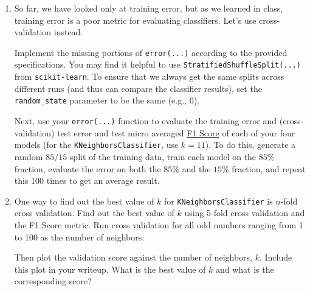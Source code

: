 \begin{enumerate}
\item {} So far, we have looked only at training error, but as we learned in class, training error is a poor metric for evaluating classifiers. Let's use cross-validation instead.

Implement the missing portions of \verb|error(...)| according to the provided specifications. You may find it helpful to use \verb|StratifiedShuffleSplit(...)| from \verb|scikit-learn|. To ensure that we always get the same splits across different runs (and thus can compare the classifier results), set the \verb|random_state| parameter to be the same (e.g., 0).


Next, use your \verb|error(...)| function to evaluate the training error and (cross-validation) test error and test micro averaged \href{https://scikit-learn.org/stable/modules/generated/sklearn.metrics.f1_score.html?highlight=f1\%20score#sklearn.metrics.f1_score}{F1 Score} of each of your four models (for the \verb|KNeighborsClassifier|, use $k=11$). To do this, generate a random $85/15$ split of the training data, train each model on the $85\%$ fraction, evaluate the error on both the $85\%$ and the $15\%$ fraction, and repeat this $100$ times to get an average result.


\item {} One way to find out the best value of $k$ for \verb|KNeighborsClassifier| is $n$-fold cross validation.
Find out the best value of $k$ using 5-fold cross validation and the F1 Score metric. Run cross validation for all odd numbers ranging from 1 to 100 as the number of neighbors.

Then plot the validation score against the number of neighbors, $k$. Include this plot in your writeup. What is the best value of $k$ and what is the corresponding score?


\end{enumerate}
